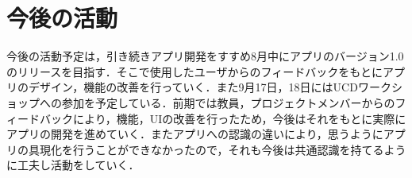 \chapter{今後の活動}
今後の活動予定は，引き続きアプリ開発をすすめ8月中にアプリのバージョン1.0のリリースを目指す．そこで使用したユーザからのフィードバックをもとにアプリのデザイン，機能の改善を行っていく．また9月17日，18日にはUCDワークショップへの参加を予定している．前期では教員，プロジェクトメンバーからのフィードバックにより，機能，UIの改善を行ったため，今後はそれをもとに実際にアプリの開発を進めていく．またアプリへの認識の違いにより，思うようにアプリの具現化を行うことができなかったので，それも今後は共通認識を持てるように工夫し活動をしていく．
